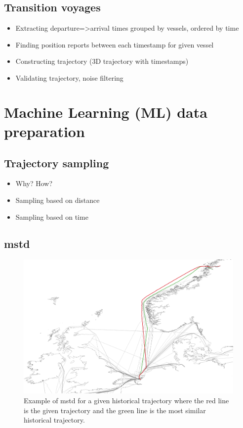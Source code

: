 \subsection{Transition voyages}

\begin{itemize}
    \item Extracting departure=>arrival times grouped by vessels, ordered by time
    \item Finding position reports between each timestamp for given vessel
    \item Constructing trajectory (3D trajectory with timestamps)
    \item Validating trajectory, noise filtering
\end{itemize}

\section{Machine Learning (ML) data preparation}

\subsection{Trajectory sampling}

\begin{itemize}
    \item Why? How?
    \item Sampling based on distance
    \item Sampling based on time
\end{itemize}

\subsection{\acrfull{mstd}}

\begin{figure}[htbp]  %
    \centering
    \includegraphics[width=1.0\textwidth]{figures/mstd}
    \caption{Example of \acrshort{mstd} for a given historical trajectory where the red line is the given trajectory and the green line is the most similar historical trajectory.}
    \label{fig:mstd}
\end{figure}


